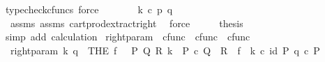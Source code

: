 \begin{isabellebody}
\ {\isacharparenleft}{\kern0pt}typecheck{\isacharunderscore}{\kern0pt}cfuncs{\isacharcomma}{\kern0pt}\ force{\isacharparenright}{\kern0pt}\isanewline
\ \ \isamarkupfalse%
\ \isamarkupfalse%
\ {\isachardoublequoteopen}{\isachardot}{\kern0pt}{\isachardot}{\kern0pt}{\isachardot}{\kern0pt}\ {\isacharequal}{\kern0pt}\ k\ {\isasymcirc}\isactrlsub c\ {\isasymlangle}p{\isacharcomma}{\kern0pt}\ q{\isasymrangle}{\isachardoublequoteclose}\isanewline
\ \ \ \ \isamarkupfalse%
\ \ assms{\isacharparenleft}{\kern0pt}{}{\isacharparenright}{\kern0pt}\ assms{\isacharparenleft}{\kern0pt}{}{\isacharparenright}{\kern0pt}\ cart{\isacharunderscore}{\kern0pt}prod{\isacharunderscore}{\kern0pt}extract{\isacharunderscore}{\kern0pt}right\ \isamarkupfalse%
\ force\isanewline
\ \ \isamarkupfalse%
\ \isamarkupfalse%
\ {\isacharquery}{\kern0pt}thesis\isanewline
\ \ \ \ \isamarkupfalse%
\ {\isacharparenleft}{\kern0pt}simp\ add{\isacharcolon}{\kern0pt}\ calculation{\isacharparenright}{\kern0pt}\isanewline
{}\isamarkupfalse%
%
\endisatagproof
{\isafoldproof}%
%
\isadelimproof
\isanewline
%
\endisadelimproof
\isanewline
{}\isamarkupfalse%
\ right{\isacharunderscore}{\kern0pt}param\ {\isacharcolon}{\kern0pt}{\isacharcolon}{\kern0pt}\ {\isachardoublequoteopen}cfunc\ {\isasymRightarrow}\ cfunc\ {\isasymRightarrow}\ cfunc{\isachardoublequoteclose}\ {\isacharparenleft}{\kern0pt}{\isachardoublequoteopen}{\isacharunderscore}{\kern0pt}\isactrlbsub {\isacharbrackleft}{\kern0pt}{\isacharminus}{\kern0pt}{\isacharcomma}{\kern0pt}{\isacharunderscore}{\kern0pt}{\isacharbrackright}{\kern0pt}\isactrlesub {\isachardoublequoteclose}\ {\isacharbrackleft}{\kern0pt}{}{}{}{\isacharcomma}{\kern0pt}{}{\isacharbrackright}{\kern0pt}{}{}{}{\isacharparenright}{\kern0pt}\ \isanewline
\ \ {\isachardoublequoteopen}right{\isacharunderscore}{\kern0pt}param\ k\ q\ {\isasymequiv}\ {\isacharparenleft}{\kern0pt}THE\ f{\isachardot}{\kern0pt}\ \ {\isasymexists}\ P\ Q\ R{\isachardot}{\kern0pt}\ k\ {\isacharcolon}{\kern0pt}\ P\ {\isasymtimes}\isactrlsub c\ Q\ {\isasymrightarrow}\ R\ {\isasymand}\ f\ {\isacharequal}{\kern0pt}\ k\ {\isasymcirc}\isactrlsub c\ {\isasymlangle}id\ P{\isacharcomma}{\kern0pt}\ q\ {\isasymcirc}\isactrlsub c\ {\isasymbeta}\isactrlbsub P\isactrlesub {\isasymrangle}{\isacharparenright}{\kern0pt}{\isachardoublequoteclose}\isanewline
\isanewline

\end{isabellebody}

